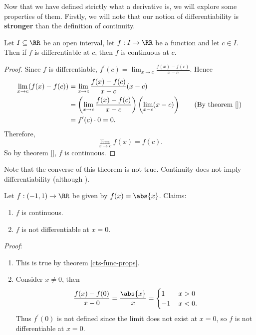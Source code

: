 \documentclass[../real_analysis.tex]{subfiles}
\begin{document}
        Now that we have defined strictly what a derivative is, we will explore some properties of them. Firstly, we will note that our notion of differentiability is \textbf{stronger} than the definition of continuity.
        \begin{theorem}\label{diff-cts}
            Let $I\subseteq\RR$ be an open interval, let $f:I\to\RR$ be a function and let $c\in I$. Then if $f$ is differentiable at $c$, then $f$ is continuous at $c$.
        \end{theorem}
        \begin{proof}
            Since $f$ is differentiable, $f^\prime(c)=\lim_{x\to c}\frac{f(x)-f(c)}{x-c}$. Hence
            \begin{align*}
                \lim_{x\to c}(f(x)-f(c))&=\lim_{x\to c}\frac{f(x)-f(c)}{x-c}(x-c)\\
                &=\left(\lim_{x\to c}\frac{f(x)-f(c)}{x-c}\right)\left(\lim_{x-c}(x-c)\right)\tag{By theorem \ref{}}\\ %
                &=f^\prime(c)\cdot0=0.
            \end{align*}
            Therefore,
            \begin{equation*}
                \lim_{x\to c}f(x)=f(c).
            \end{equation*}
            So by theorem \ref{}, $f$ is continuous. %
        \end{proof}
        Note that the converse of this theorem is not true. Continuity does not imply differentiability (although ).
        \begin{example}
            Let $f:(-1,1)\to\RR$ be given by $f(x)=\abs{x}$. Claims:
            \begin{enumerate}[label={\upshape(\roman*)}]
                \item $f$ is continuous.
                \item $f$ is not differentiable at $x=0$.
            \end{enumerate}
            \textit{Proof}:
            \begin{enumerate}[label={\upshape(\roman*)}]
                \item This is true by theorem \ref{cts-func-props}.
                \item Consider $x\neq 0$, then
                \begin{equation*}
                    \frac{f(x)-f(0)}{x-0}=\frac{\abs{x}}{x}=\begin{cases}
                        1\,&x>0\\
                        -1\,&x<0.
                    \end{cases}
                \end{equation*}
                Thus $f^\prime(0)$ is not defined since the limit does not exist at $x=0$, so $f$ is not differentiable at $x=0$.
            \end{enumerate}
        \end{example}
\end{document}
